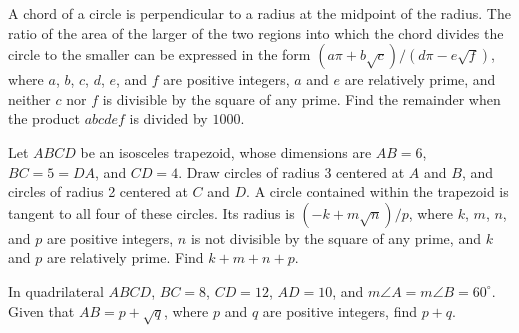 \documentclass[11pt]{article}
\theoremstyle{definition}
\begin{document}
\begin{question}[name={2004 AIME II, \href{https://artofproblemsolving.com/community/c4p371256}{Problem 1}}]
	A chord of a circle is perpendicular to a radius at the midpoint of the radius. The ratio of the area of the larger of the two regions into which the chord divides the circle to the smaller can be expressed in the form $(a\pi+b\sqrt{c})/(d\pi-e\sqrt{f})$, where $a$, $b$, $c$, $d$, $e$, and $f$ are positive integers, $a$ and $e$ are relatively prime, and neither $c$ nor $f$ is divisible by the square of any prime. Find the remainder when the product $abcdef$ is divided by $1000$.
\end{question}


%	












\begin{question}[name={2004 AIME II, \href{https://artofproblemsolving.com/community/c4p371226}{Problem 12}}]
	Let $ABCD$ be an isosceles trapezoid, whose dimensions are $AB = 6$, $BC=5=DA$, and $CD=4$. Draw circles of radius 3 centered at $A$ and $B$, and circles of radius 2 centered at $C$ and $D$. A circle contained within the trapezoid is tangent to all four of these circles. Its radius is $(-k+m\sqrt{n})/p$, where $k$, $m$, $n$, and $p$ are positive integers, $n$ is not divisible by the square of any prime, and $k$ and $p$ are relatively prime. Find $k+m+n+p$.	
\end{question}


%	
























\begin{question}[name={2005 AIME I, \href{https://artofproblemsolving.com/community/c4p365549}{Problem 7}}]
	In quadrilateral $ABCD$, $BC=8$, $CD=12$, $AD=10$, and $m\angle A= m\angle B = 60^\circ$. Given that $AB=p + \sqrt{q}$, where $p$ and $q$ are positive integers, find $p+q$.	
\end{question}
\end{document}
